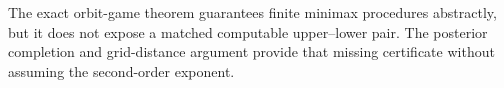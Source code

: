 The exact orbit-game theorem guarantees finite minimax procedures abstractly, but it does not expose a matched computable upper--lower pair.  The posterior completion and grid-distance argument provide that missing certificate without assuming the second-order exponent.